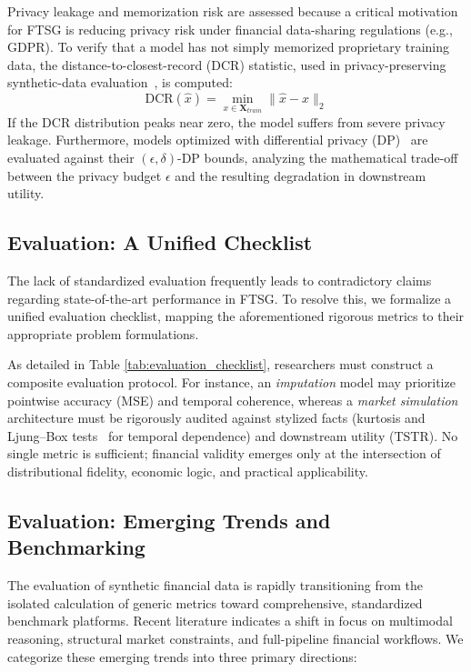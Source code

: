 \documentclass[11pt,a4paper]{article}
\begin{document}
Privacy leakage and memorization risk are assessed because a critical motivation for FTSG is reducing privacy risk under financial data-sharing regulations (e.g., GDPR). To verify that a model has not simply memorized proprietary training data, the distance-to-closest-record (DCR) statistic, used in privacy-preserving synthetic-data evaluation~\citep{bindschaedler2017plausible}, is computed:
    \begin{equation}
        \text{DCR}(\hat{x}) = \min_{x \in \mathbf{X}_{train}} \|\hat{x} - x\|_2
    \end{equation}
If the DCR distribution peaks near zero, the model suffers from severe privacy leakage. Furthermore, models optimized with differential privacy (DP)~\citep{dwork2006differential,dwork2014algorithmic} are evaluated against their $(\epsilon, \delta)$-DP bounds, analyzing the mathematical trade-off between the privacy budget $\epsilon$ and the resulting degradation in downstream utility.

\subsection{Evaluation: A Unified Checklist}
The lack of standardized evaluation frequently leads to contradictory claims regarding state-of-the-art performance in FTSG. To resolve this, we formalize a unified evaluation checklist, mapping the aforementioned rigorous metrics to their appropriate problem formulations.

As detailed in Table \ref{tab:evaluation_checklist}, researchers must construct a composite evaluation protocol. For instance, an \textit{imputation} model may prioritize pointwise accuracy (MSE) and temporal coherence, whereas a \textit{market simulation} architecture must be rigorously audited against stylized facts (kurtosis and Ljung--Box tests~\citep{ljung1978measure} for temporal dependence) and downstream utility (TSTR). No single metric is sufficient; financial validity emerges only at the intersection of distributional fidelity, economic logic, and practical applicability.

\subsection{Evaluation: Emerging Trends and Benchmarking}

The evaluation of synthetic financial data is rapidly transitioning from the isolated calculation of generic metrics toward comprehensive, standardized benchmark platforms. Recent literature indicates a shift in focus on multimodal reasoning, structural market constraints, and full-pipeline financial workflows. We categorize these emerging trends into three primary directions:
\end{document}
